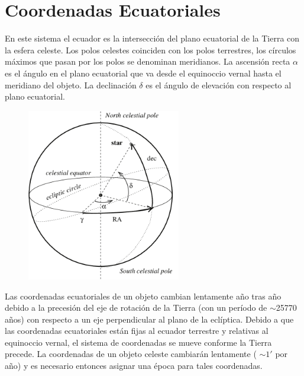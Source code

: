 
\section{Coordenadas Ecuatoriales}\label{apendice:ecuatorial}

En este sistema el ecuador es la intersección del plano ecuatorial de la Tierra con la esfera celeste. Los polos celestes coinciden con los polos terrestres, los círculos máximos que pasan por los polos se denominan meridianos. La ascensión recta $\alpha$ es el ángulo en el plano ecuatorial que va desde el equinoccio vernal hasta el meridiano del objeto. La declinación $\delta$ es el ángulo de elevación con respecto al plano ecuatorial.

\begin{figure}[H]
    \begin{small}
        \begin{center}
            \includegraphics[width=0.6\textwidth]{EC.png}
        \end{center}
        \caption{}
        \label{fig:}
    \end{small}
\end{figure}


Las coordenadas ecuatoriales de un objeto cambian lentamente año tras año debido a la precesión del eje de rotación de la Tierra (con un período de $\sim$25770 años) con respecto a un eje perpendicular al plano de la eclíptica. Debido a que las coordenadas ecuatoriales están fijas al ecuador terrestre y relativas al equinoccio vernal, el sistema de coordenadas se mueve conforme la Tierra precede. La coordenadas de un objeto celeste cambiarán lentamente ( $\sim 1'$ por año) y es necesario entonces asignar una época para tales coordenadas.

